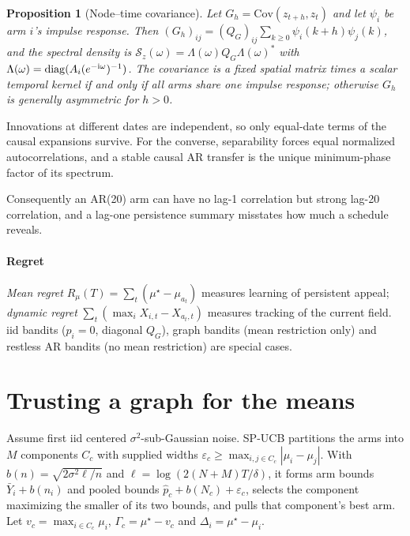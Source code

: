 \documentclass[conference]{IEEEtran}
\newtheorem{proposition}{Proposition}
\newcommand{\Cov}{\mathrm{Cov}}
\newcommand{\diag}{\operatorname{diag}}
\begin{document}
\begin{proposition}[Node--time covariance]\label{prop:cov}
Let $G_h=\Cov(z_{t+h},z_t)$ and let $\psi_i$ be arm $i$'s impulse response. Then $(G_h)_{ij}=(Q_G)_{ij}\sum_{k\ge0}\psi_i(k+h)\psi_j(k)$, and the spectral density is $\mathcal S_z(\omega)=\Lambda(\omega)Q_G\Lambda(\omega)^*$ with $\Lambda(\omega)=\diag(A_i(e^{-{\rm i}\omega})^{-1})$. The covariance is a fixed spatial matrix times a scalar temporal kernel if and only if all arms share one impulse response; otherwise $G_h$ is generally asymmetric for $h>0$.
\end{proposition}

\begin{IEEEproof}[Sketch]
Innovations at different dates are independent, so only equal-date terms of the causal expansions survive. For the converse, separability forces equal normalized autocorrelations, and a stable causal AR transfer is the unique minimum-phase factor of its spectrum.
\end{IEEEproof}

Consequently an AR(20) arm can have no lag-1 correlation but strong lag-20 correlation, and a lag-one persistence summary misstates how much a schedule reveals.

\paragraph*{Regret} \emph{Mean regret} $R_\mu(T)=\sum_t(\mu^\star-\mu_{a_t})$ measures learning of persistent appeal; \emph{dynamic regret} $\sum_t(\max_iX_{i,t}-X_{a_t,t})$ measures tracking of the current field. iid bandits ($p_i=0$, diagonal $Q_G$), graph bandits (mean restriction only) and restless AR bandits (no mean restriction) are special cases.

\section{Trusting a graph for the means}\label{sec:pool}

Assume first iid centered $\sigma^2$-sub-Gaussian noise. SP-UCB partitions the arms into $M$ components $C_c$ with supplied widths $\varepsilon_c\ge\max_{i,j\in C_c}|\mu_i-\mu_j|$. With $b(n)=\sqrt{2\sigma^2\ell/n}$ and $\ell=\log(2(N+M)T/\delta)$, it forms arm bounds $\bar Y_i+b(n_i)$ and pooled bounds $\hat p_c+b(N_c)+\varepsilon_c$, selects the component maximizing the smaller of its two bounds, and pulls that component's best arm. Let $v_c=\max_{i\in C_c}\mu_i$, $\Gamma_c=\mu^\star-v_c$ and $\Delta_i=\mu^\star-\mu_i$.
\end{document}
